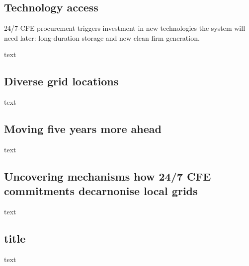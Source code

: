 \subsection{Technology access}
\label{subsec:palette}

\vspace*{5pt}
\begin{res}
    24/7-CFE procurement triggers investment in new technologies the system will need later: long-duration storage and new clean firm generation.
\end{res}


text 

\subsection{Diverse grid locations}
\label{subsec:location}

text 

\subsection{Moving five years more ahead}
\label{subsec:time}

text 

\subsection{Uncovering mechanisms how 24/7 CFE commitments decarnonise local grids}
\label{subsec:mechanisms}

text 


\subsection{title}

text
